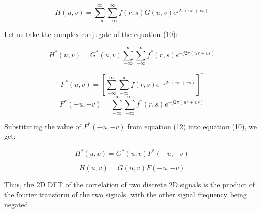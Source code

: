 \documentclass[12pt]{article}
\begin{document}
\begin{equation}
    H(u, v) = \sum_{-\infty}^{\infty} \sum_{-\infty}^{\infty} f(r, s) G(u,v) e^{j2\pi(ur+vs)}
\end{equation}


Let us take the complex conjugate of the equation (10):

\begin{equation}
    H^*(u, v) = G^*(u,v) \sum_{-\infty}^{\infty} \sum_{-\infty}^{\infty} f^*(r, s)  e^{-j2\pi(ur+vs)}
\end{equation}

\begin{equation}
    F^*(u, v) = [\sum_{-\infty}^{\infty} \sum_{-\infty}^{\infty} f(r, s)  e^{-j2\pi(ur+vs)}]^*
\end{equation}
\begin{equation}
    F^*(-u, -v) = \sum_{-\infty}^{\infty} \sum_{-\infty}^{\infty} f^*(r, s)  e^{-j2\pi(ur+vs)}
\end{equation}

Substituting the value of $F^*(-u, -v)$ from equation (12) into equation (10), we get:

\begin{equation}
    H^*(u, v) = G^*(u,v) F^*(-u, -v)
\end{equation}

\begin{equation}
    H(u, v) = G(u,v) F(-u, -v)
\end{equation}

Thus, the 2D DFT of the correlation of two discrete 2D signals is the product of the fourier transform of the two signals, with the other signal frequency being negated.
\end{document}

